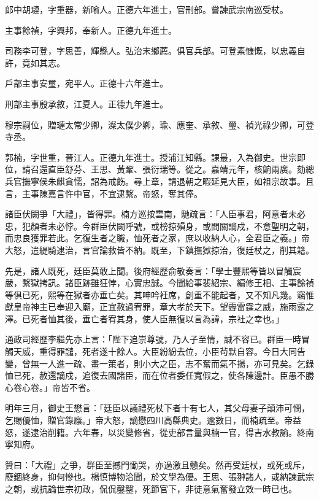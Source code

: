 \begin{pinyinscope}
郎中胡璉，字重器，新喻人。正德六年進士，官刑部。嘗諫武宗南巡受杖。

主事餘禎，字興邦，奉新人。正德九年進士。

司務李可登，字思善，輝縣人。弘治末鄉薦。俱官兵部。可登素慷慨，以忠義自許，竟如其志。

戶部主事安璽，宛平人。正德十六年進士。

刑部主事殷承敘，江夏人。正德九年進士。

穆宗嗣位，贈璉太常少卿，澯太僕少卿，瑜、應奎、承敘、璽、禎光祿少卿，可登寺丞。

郭楠，字世重，晉江人。正德九年進士。授浦江知縣。課最，入為御史。世宗即位，請召還直臣舒芬、王思、黃鞏、張衍瑞等。從之。嘉靖元年，核餉兩廣。劾總兵官撫寧侯朱麒貪懦，詔為戒飭。尋上章，請退朝之暇延見大臣，如祖宗故事。且言，主事陳嘉言忤中官，不宜逮繫。帝怒，奪其俸。

諸臣伏闕爭「大禮」，皆得罪。楠方巡按雲南，馳疏言：「人臣事君，阿意者未必忠，犯顏者未必悖。今群臣伏闕呼號，或榜掠殞身，或間關謫戍，不意聖明之朝，而忠良獲罪若此。乞復生者之職，恤死者之家，庶以收納人心，全君臣之義。」帝大怒，遣緹騎逮治，言官論救皆不納。既至，下鎮撫獄掠治，復廷杖之，削其籍。

先是，諸人既死，廷臣莫敢上聞。後府經歷俞敬奏言：「學士豐熙等皆以冒觸宸嚴，繫獄拷訊。諸臣跡雖狂悖，心實忠誠。今聞給事裴紹宗、編修王相、主事餘禎等俱已死，熙等在獄者亦垂亡矣。其呻吟衽席，創重不能起者，又不知凡幾。竊惟獻皇帝神主已奉迎入廟，正宜赦過宥罪，章大孝於天下。望霽雷霆之威，施雨露之澤。已死者恤其後，垂亡者宥其身，使人臣無復以言為諱，宗社之幸也。」

通政司經歷李繼先亦上言：「陛下追崇尊號，乃人子至情，誠不容已。群臣一時冒觸天威，重得罪譴，死者遂十餘人。大臣紛紛去位，小臣茍默自容。今日大同告變，曾無一人進一疏、畫一策者，則小大之臣，志不奮而氣不揚，亦可見矣。乞錄恤已死，赦還謫戍，追復去國諸臣，而在位者委任寬假之，使各陳邊計。臣愚不勝心卷心卷。」帝皆不省。

明年三月，御史王懋言：「廷臣以議禮死杖下者十有七人，其父母妻子顛沛可憫，乞賜優恤，贈官錄廕。」帝大怒，謫懋四川高縣典史。逾數日，而楠疏至。帝益怒，遂逮治削籍。六年春，以災變修省，從吏部言量與楠一官，得吉水教諭。終南寧知府。

贊曰：「大禮」之爭，群臣至撼門慟哭，亦過激且戇矣。然再受廷杖，或死或斥，廢錮終身，抑何慘也。楊慎博物洽聞，於文學為優。王思、張翀諸人，或納諫武宗之朝，或抗論世宗初政，侃侃鑿鑿，死節官下，非徒意氣奮發立效一時已也。


\end{pinyinscope}